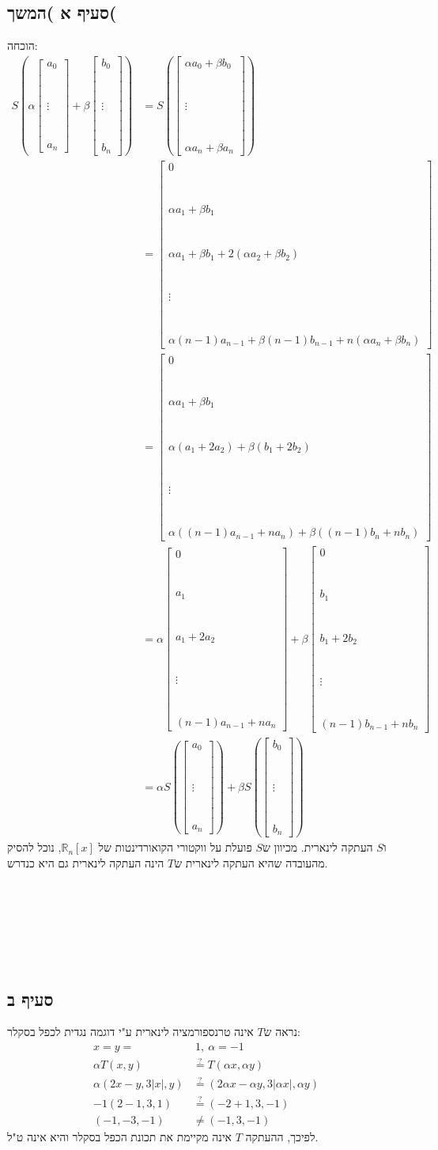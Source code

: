 \documentclass[11pt, oneside]{article}
\newcommand{\qed}{\R{$\blacksquare$}}
\newcommand{\br}{\\\\\\\\\\\\\\}
\newcommand{\mR}{\mathbb{R}}
\begin{document}
\subsection{סעיף א )המשך(}
הוכחה:
\begin{align*}
S\left(\alpha \begin{bmatrix}
a_0\br
\vdots\br
a_n
\end{bmatrix} + \beta \begin{bmatrix}
b_0\br
\vdots\br
b_n
\end{bmatrix}\right)
& = S\left(\begin{bmatrix}
\alpha a_0 + \beta b_0\br
\vdots\br
\alpha a_n + \beta a_n
\end{bmatrix}\right)\\
& = \begin{bmatrix}
0\br
\alpha a_1 + \beta b_1\br
\alpha a_1 + \beta b_1 + 2(\alpha a_2 + \beta b_2)\br
\vdots\br
\alpha (n - 1)a_{n - 1} + \beta (n - 1)b_{n - 1} + n(\alpha a_n + \beta b_n)
\end{bmatrix}\\
& = \begin{bmatrix}
0\br
\alpha a_1 + \beta b_1\br
\alpha (a_1 + 2a_2) + \beta (b_1 + 2b_2)\br
\vdots\br
\alpha ((n-1)a_{n-1} + na_n) + \beta ((n-1)b_n + nb_n)
\end{bmatrix}\\
& = \alpha \begin{bmatrix}
0\br
a_1\br
a_1 + 2a_2\br
\vdots\br
(n - 1)a_{n - 1} + na_n
\end{bmatrix} + \beta \begin{bmatrix}
0\br
b_1\br
b_1 + 2b_2\br
\vdots\br
(n - 1)b_{n - 1} + nb_n
\end{bmatrix}\\
& = \alpha S\left(\begin{bmatrix}
a_0\br
\vdots\br
a_n
\end{bmatrix}\right) + \beta S\left(\begin{bmatrix}
b_0\br
\vdots\br
b_n
\end{bmatrix}\right)
\end{align*}
ו$S$ העתקה לינארית. מכיוון ש$S$ פועלת על ווקטורי הקואורדינטות של $\mR_n[x]$, נוכל להסיק מהעובדה שהיא העתקה לינארית ש$T$ הינה העתקה לינארית גם היא כנדרש.
\br\qed
\clearpage

\subsection{סעיף ב}
נראה ש$T$ אינה טרנספורמציה לינארית ע"י דוגמה נגדית לכפל בסקלר:
\begin{align*}
x = y = &\ 1,\ \alpha = -1\\
\alpha T(x, y) & \overset{?}{=} T(\alpha x, \alpha y)\\
\alpha (2x - y, 3|x|, y) & \overset{?}{=} (2\alpha x - \alpha y, 3|\alpha x|, \alpha y)\\
-1 (2 - 1, 3, 1) & \overset{?}{=} (-2 + 1, 3, -1)\\
(-1, -3, -1) & \neq (-1, 3, -1)
\end{align*}
לפיכך, ההעתקה $T$ אינה מקיימת את תכונת הכפל בסקלר והיא אינה ט"ל.
\br\qed
\end{document}
